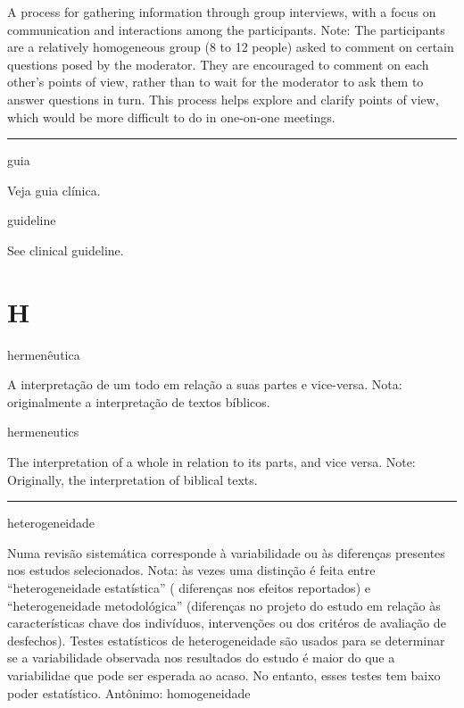 \documentclass[
]{book}
\begin{document}
A process for gathering information through group interviews, with a focus on communication and interactions among the participants. Note: The participants are a relatively homogeneous group (8 to 12 people) asked to comment on certain questions posed by the moderator. They are encouraged to comment on each other's points of view, rather than to wait for the moderator to ask them to answer questions in turn. This process helps explore and clarify points of view, which would be more difficult to do in one-on-one meetings.

\begin{center}\rule{0.5\linewidth}{0.5pt}\end{center}

guia

Veja guia clínica.

guideline

See clinical guideline.

\hypertarget{h}{%
\chapter*{H}\label{h}}

hermenêutica

A interpretação de um todo em relação a suas partes e vice-versa. Nota: originalmente a interpretação de textos bíblicos.

hermeneutics

The interpretation of a whole in relation to its parts, and vice versa. Note: Originally, the interpretation of biblical texts.

\begin{center}\rule{0.5\linewidth}{0.5pt}\end{center}

heterogeneidade

Numa revisão sistemática corresponde à variabilidade ou às diferenças presentes nos estudos selecionados. Nota: às vezes uma distinção é feita entre ``heterogeneidade estatística'' ( diferenças nos efeitos reportados) e ``heterogeneidade metodológica'' (diferenças no projeto do estudo em relação às características chave dos indivíduos, intervenções ou dos critéros de avaliação de desfechos). Testes estatísticos de heterogeneidade são usados para se determinar se a variabilidade observada nos resultados do estudo é maior do que a variabilidae que pode ser esperada ao acaso. No entanto, esses testes tem baixo poder estatístico. Antônimo: homogeneidade
\end{document}

